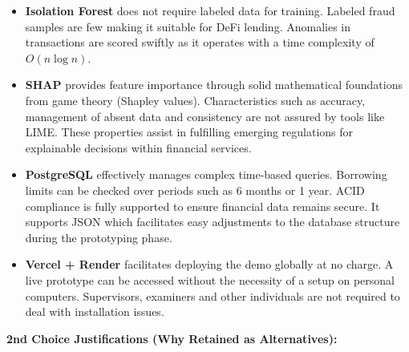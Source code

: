 \documentclass[12pt,a4paper]{report}
\begin{document}
\begin{itemize}[noitemsep]
\item \textbf{Isolation Forest} does not require labeled data for training. Labeled fraud samples are few making it suitable for DeFi lending. Anomalies in transactions are scored swiftly as it operates with a time complexity of $O(n \log n)$.

\item \textbf{SHAP} provides feature importance through solid mathematical foundations from game theory (Shapley values). Characteristics such as accuracy, management of absent data and consistency are not assured by tools like LIME. These properties assist in fulfilling emerging regulations for explainable decisions within financial services.

\item \textbf{PostgreSQL} effectively manages complex time-based queries. Borrowing limits can be checked over periods such as 6 months or 1 year. ACID compliance is fully supported to ensure financial data remains secure. It supports JSON which facilitates easy adjustments to the database structure during the prototyping phase.

\item \textbf{Vercel + Render} facilitates deploying the demo globally at no charge. A live prototype can be accessed without the necessity of a setup on personal computers. Supervisors, examiners and other individuals are not required to deal with installation issues.
\end{itemize}

\textbf{2nd Choice Justifications (Why Retained as Alternatives):}
\end{document}
